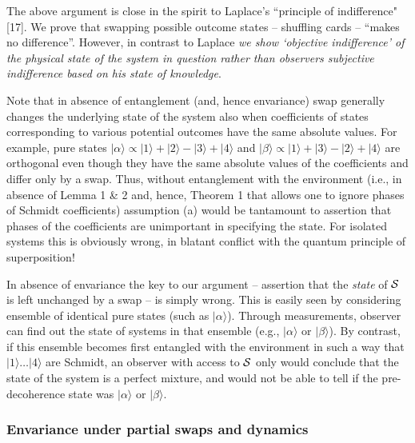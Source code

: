 \documentclass[aps,pra,epsfig,11pt,floatfix]{revtex4}
\begin{document}
The above argument is close in the spirit to Laplace's ``principle of
indifference" [17]. We prove that swapping possible outcome states -- shuffling
cards -- ``makes no difference''. However, in contrast to Laplace {\it we show
`objective indifference' of the physical state of the system in question rather 
than observers subjective indifference based on his state of knowledge}.

Note that in absence of entanglement (and, hence envariance) swap generally 
changes the underlying state of the system also when coefficients of states
corresponding to various potential outcomes have the same absolute values. 
For example, pure states 
$|\alpha\rangle \propto |1\rangle +|2\rangle-|3\rangle+|4\rangle$ and
$|\beta\rangle \propto |1\rangle +|3\rangle-|2\rangle+|4\rangle$ are orthogonal
even though they have the same absolute values of the coefficients and differ
only by a swap. Thus, without entanglement with the environment (i.e.,
in absence of Lemma 1 \& 2 and, hence, Theorem 1 that allows one to
ignore phases of Schmidt coefficients) assumption (a) would be tantamount
to assertion that phases of the coefficients are unimportant in specifying
the state. For isolated systems this is obviously wrong, in blatant 
conflict with the quantum principle of superposition! 

In absence of envariance the key to our argument -- assertion that the 
{\it state} of ${\cal S}$ is left unchanged by a swap -- is simply wrong. 
This is easily seen by considering ensemble of identical pure states (such
as $|\alpha\rangle$). Through measurements, observer can
find out the state of systems in that ensemble (e.g., 
 $|\alpha\rangle$ or $|\beta\rangle$). By contrast,
if this ensemble becomes first entangled with the environment in
such a way that $|1\rangle \dots |4\rangle$ are Schmidt, an observer with
access to ${\cal S}$ only would conclude that the state of the system is
a perfect mixture, and would not be able to tell if the pre-decoherence state
was $|\alpha\rangle$ or $|\beta\rangle$.

\subsubsection{Envariance under partial swaps and dynamics}
\end{document}
